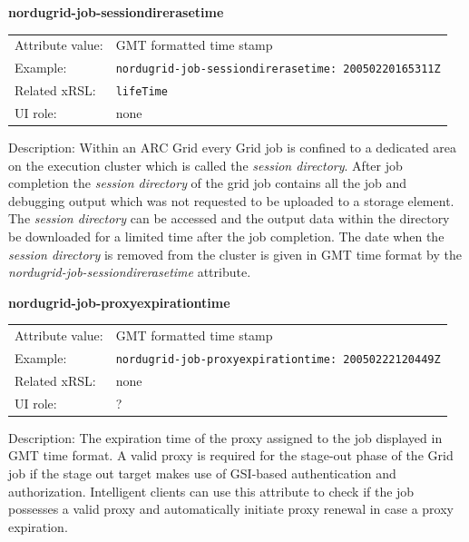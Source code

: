 \documentclass{article}
\begin{document}
  \hspace*{0.5cm}
  \begin{shaded}
    \textbf{nordugrid-job-sessiondirerasetime}
  \end{shaded}
  \begin{tabular}{lp{10cm}}  
    Attribute value:& GMT formatted time stamp\\
    Example:& \verb#nordugrid-job-sessiondirerasetime: 20050220165311Z#\\
    Related xRSL:& \verb#lifeTime#\\
    UI role:& none\\
  \end{tabular}

Description: Within an ARC Grid every Grid job is confined to a dedicated 
area on the execution cluster which is called the {\it session directory}. 
After job completion the {\it session directory} of the 
grid job contains all the job and debugging output which was not requested 
to be uploaded to a storage element. The {\it session directory} can be accessed 
and the output data within the directory be downloaded for a limited time 
after the job completion. The date when the {\it session directory} is removed 
from the cluster is given in GMT time format by the 
{\it nordugrid-job-sessiondirerasetime} attribute. 

  \hspace*{0.5cm}
  \begin{shaded}
    \textbf{nordugrid-job-proxyexpirationtime}
  \end{shaded}
  \begin{tabular}{lp{10cm}}  
    Attribute value:& GMT formatted time stamp\\
    Example:& \verb#nordugrid-job-proxyexpirationtime: 20050222120449Z#\\
    Related xRSL:& none\\
    UI role:& ?\\
  \end{tabular}

Description: The expiration time of the proxy assigned to the job displayed in GMT
time format. A valid proxy is required for the stage-out phase of the Grid job if the
stage out target makes use of GSI-based authentication and authorization.
Intelligent clients can use this attribute to check if the job possesses a valid proxy 
and  automatically initiate proxy renewal in case a proxy expiration.
\end{document}
